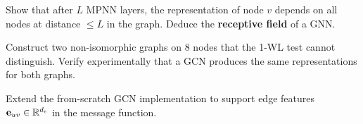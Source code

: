 \begin{exercise}
Show that after $L$ MPNN layers, the representation of node $v$ depends on all
nodes at distance $\leq L$ in the graph. Deduce the \textbf{receptive field}
of a GNN.
\end{exercise}

\begin{exercise}
Construct two non-isomorphic graphs on 8 nodes that the 1-WL test cannot
distinguish. Verify experimentally that a GCN produces the same
representations for both graphs.
\end{exercise}

\begin{exercise}
Extend the from-scratch GCN implementation to support edge features
$\mathbf{e}_{uv} \in \mathbb{R}^{d_e}$ in the message function.
\end{exercise}
